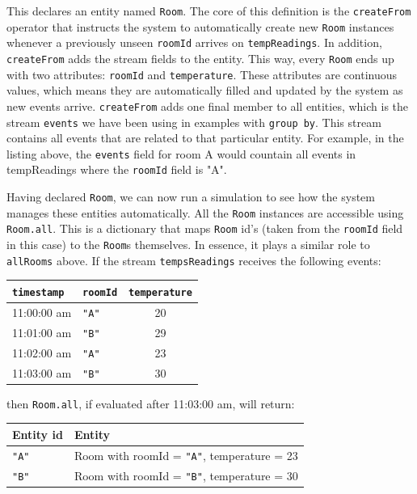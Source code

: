 This declares an entity named \verb=Room=. The core of this definition
is the \verb=createFrom= operator that instructs the system to
automatically create new \verb=Room= instances whenever a previously
unseen \verb=roomId= arrives on \verb=tempReadings=. In addition,
\verb=createFrom= adds the stream fields to the entity. This way,
every \verb=Room= ends up with two attributes: \verb=roomId= and
\verb=temperature=. These attributes are continuous values, which
means they are automatically filled and updated by the system as new
events arrive. \verb=createFrom= adds one final member to all
entities, which is the stream \verb=events= we have been using in
examples with \verb=group by=. This stream contains all events that
are related to that particular entity. For example, in the listing
above, the \verb=events= field for room A would countain all events in
tempReadings where the \verb=roomId= field is "A".

Having declared \verb=Room=, we can now run a simulation to see how
the system manages these entities automatically. All the \verb=Room=
instances are accessible using \verb=Room.all=. This is a dictionary
that maps \verb=Room= id's (taken from the \verb=roomId= field in
this case) to the \verb=Room=s themselves. In essence, it plays a similar
role to \verb=allRooms= above. If the stream \verb=tempsReadings=
receives the following events:

\begin{tabular}{ |l|l|c| }
  \hline
  \verb=timestamp= & \verb=roomId= & \verb=temperature= \\
  \hline
  11:00:00 am & \verb="A"= & 20 \\
  11:01:00 am & \verb="B"= & 29 \\
  11:02:00 am & \verb="A"= & 23 \\
  11:03:00 am & \verb="B"= & 30 \\
  \hline
\end{tabular}

then \verb=Room.all=, if evaluated after 11:03:00 am, will return:

\begin{tabular}{ |l|l| }
  \hline
  Entity id & Entity \\
  \hline
  \verb="A"= & Room with roomId = \verb="A"=, temperature = 23 \\
  \verb="B"= & Room with roomId = \verb="B"=, temperature = 30 \\
  \hline
\end{tabular}

